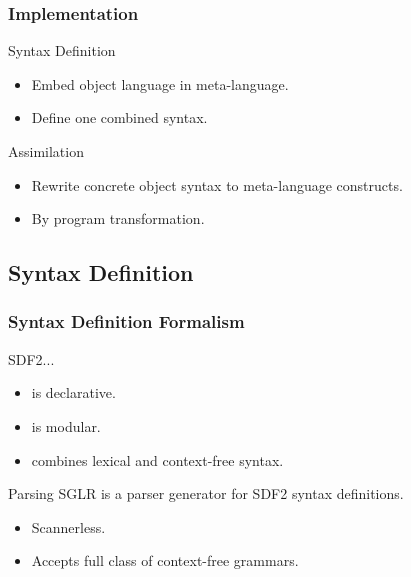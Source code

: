 \documentclass{beamer}
\begin{document}


\begin{frame}

  \frametitle{Implementation}

  \begin{block}{Syntax Definition}
    \begin{itemize}
      \item Embed object language in meta-language.
      \item Define one combined syntax.
    \end{itemize}
  \end{block}

  \begin{block}{Assimilation}
    \begin{itemize}
      \item Rewrite concrete object syntax to meta-language constructs.
      \item By program transformation.
    \end{itemize}
  \end{block}

\end{frame}


\subsection{Syntax Definition}

\begin{frame}

  \frametitle{Syntax Definition Formalism}

  \begin{block}{SDF2...}
    \begin{itemize}
      \item is declarative.
      \item is modular.
      \item combines lexical and context-free syntax.
    \end{itemize}
  \end{block}

  \begin{block}{Parsing}
    SGLR is a parser generator for SDF2 syntax definitions.
    \begin{itemize}
      \item Scannerless.
      \item Accepts full class of context-free grammars.
    \end{itemize}
  \end{block}

\end{frame}
\end{document}
